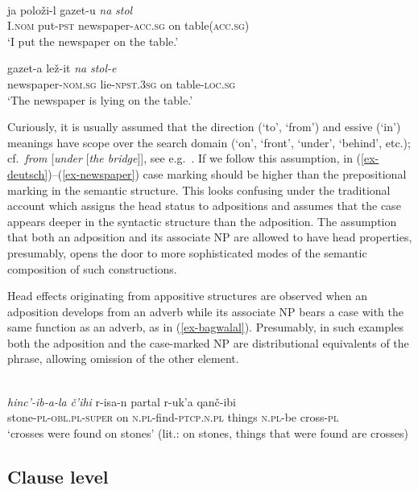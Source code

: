 \documentclass[output=paper,nobabel,draftmode  ,colorlinks, citecolor=brown]{langscibook}
\begin{document}
\ea\label{ex-newspaper}  
\\ 
\ea
\gll ja	položi-l   gazet-u	 \emph{na} \emph{stol}\\ 
     I.\textsc{nom}	put-\textsc{pst} newspaper-\textsc{acc.sg} on table(\textsc{acc.sg}) \\
\glt `I put the newspaper on the table.'

\ex
\gll gazet-a lež-it  \emph{na} \emph{stol-e}\\ newspaper-\textsc{nom.sg} lie-\textsc{npst.3sg} on table-\textsc{loc.sg}\\
\glt `The newspaper is lying on the table.'
\z\z

\noindent
Curiously, it is usually assumed that the direction (`to', `from') and essive (`in') meanings have scope
over the search domain (`on', `front', `under', `behind', etc.); cf.\ \emph{from} [\emph{under} [\emph{the bridge}]], see
e.g.\ \citet{CR2010a}. If we follow this assumption, in (\ref{ex-deutsch})--(\ref{ex-newspaper}) case
marking should be higher than the prepositional marking in the semantic structure. This looks
confusing under the traditional account which assigns the head status to adpositions and assumes
that the case appears deeper in the syntactic structure than the adposition. The assumption that
both an adposition and its associate NP are allowed to have head properties, presumably, opens the
door to more sophisticated modes of the semantic composition of such constructions.

Head effects originating from appositive structures are observed when an adposition develops from an
adverb while its associate NP bears a case with the same function as an adverb, as in
(\ref{ex-bagwalal}). Presumably, in such examples both the adposition and the case-marked NP are
distributional equivalents of the phrase, allowing omission of the other element.  

\ea\label{ex-bagwalal} 
\\
\gll \emph{hinc'-ib-a-la}                  \emph{č’ihi}  r-isa-n partal	r-uk’a	qanč-ibi  \\ 
     stone-\textsc{pl-obl.pl-super} on \textsc{n.pl}-find-\textsc{ptcp.n.pl}	things \textsc{n.pl}-be	cross-\textsc{pl} \\
\glt `crosses were found on stones' (lit.: on stones, things that were found are crosses)
\z

\subsection{Clause level}\label{subsec-clause}
\end{document}
